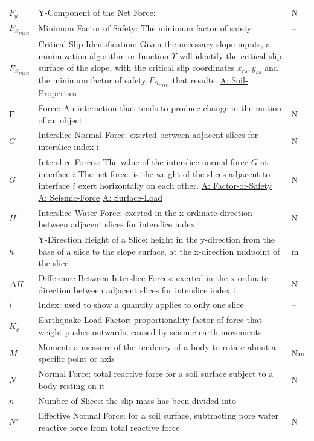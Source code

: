 \documentclass[12pt]{article}
\begin{document}
\begin{longtabu}{l X[l] l}
\\
${F_{y}}$ & Y-Component of the Net Force:  & N
\\
${{F_{S}}_{min}}$ & Minimum Factor of Safety: The minimum factor of safety & --
\\
${{F_{S}}_{min}}$ & Critical Slip Identification: Given the necessary slope inputs, a minimization algorithm or function $Υ$ will identify the critical slip surface of the slope, with the critical slip coordinates ${x_{cs}},{y_{cs}}$ and the minimum factor of safety ${{F_{S}}_{min}}$ that results. \hyperref[assumpSP]{A: Soil-Properties} & --
\\
$\mathbf{F}$ & Force: An interaction that tends to produce change in the motion of an object & N
\\
$G$ & Interslice Normal Force: exerted between adjacent slices for interslice index i & N
\\
$G$ & Interslice Forces: The value of the interslice normal force $G$ at interface $i$ The net force. is the weight of the slices adjacent to interface $i$ exert horizontally on each other. \hyperref[assumpFOS]{A: Factor-of-Safety} \hyperref[assumpSF]{A: Seismic-Force} \hyperref[assumpSL]{A: Surface-Load} & N
\\
$H$ & Interslice Water Force: exerted in the x-ordinate direction between adjacent slices for interslice index i & N
\\
$h$ & Y-Direction Height of a Slice: height in the y-direction from the base of a slice to the slope surface, at the x-direction midpoint of the slice & m
\\
$ΔH$ & Difference Between Interslice Forces: exerted in the x-ordinate direction between adjacent slices for interslice index i & N
\\
$i$ & Index: used to show a quantity applies to only one slice & --
\\
${K_{c}}$ & Earthquake Load Factor: proportionality factor of force that weight pushes outwards; caused by seismic earth movements & --
\\
$M$ & Moment: a measure of the tendency of a body to rotate about a specific point or axis & Nm
\\
$N$ & Normal Force: total reactive force for a soil surface subject to a body resting on it & N
\\
$n$ & Number of Slices: the slip mass has been divided into & --
\\
$N'$ & Effective Normal Force: for a soil surface, subtracting pore water reactive force from total reactive force & N
\\

\end{longtabu}
\end{document}
